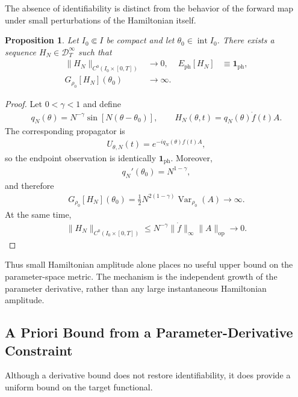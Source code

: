 \documentclass[twocolumn,prl,aps,floatfix]{revtex4-2}
\newtheorem{proposition}{Proposition}
\begin{document}
The absence of identifiability is distinct from the behavior of the forward map under small perturbations of the Hamiltonian itself.

\begin{proposition}
Let $I_0\Subset I$ be compact and let
$\theta_0\in\operatorname{int}I_0$. There exists a sequence
$H_N\in\mathcal D_T^\infty$ such that
\begin{align}
\|H_N\|_{C^0(I_0\times[0,T])}&\longrightarrow0,
&
E_{\mathrm{ph}}[H_N]&\equiv\mathbf 1_{\mathrm{ph}},
\label{eq:small_H}
\\
G_{\rho_0}[H_N](\theta_0)&\longrightarrow\infty .
\label{eq:large_G}
\end{align}
\end{proposition}

\begin{proof}
Let $0<\gamma<1$ and define
\begin{align}
q_N(\theta)
=
N^{-\gamma}
\sin\!\left[N(\theta-\theta_0)\right],
\qquad
H_N(\theta,t)
=
q_N(\theta)\dot f(t)A .
\end{align}
The corresponding propagator is
\begin{align}
U_{\theta,N}(t)
=
e^{-iq_N(\theta)f(t)A},
\end{align}
so the endpoint observation is identically $\mathbf 1_{\mathrm{ph}}$. Moreover,
\begin{align}
q_N'(\theta_0)=N^{1-\gamma},
\end{align}
and therefore
\begin{align}
G_{\rho_0}[H_N](\theta_0)
=
\frac{1}{2}
N^{2(1-\gamma)}
\operatorname{Var}_{\rho_0}(A)
\longrightarrow\infty .
\end{align}
At the same time,
\begin{align}
\|H_N\|_{C^0(I_0\times[0,T])}
\le
N^{-\gamma}\|\dot f\|_{\infty}
\|A\|_{\mathrm{op}}
\longrightarrow0.
\end{align}
\end{proof}

Thus small Hamiltonian amplitude alone places no useful upper bound on the parameter-space metric. The mechanism is the independent growth of the parameter derivative, rather than any large instantaneous Hamiltonian amplitude.

\subsection{A Priori Bound from a Parameter-Derivative Constraint}

Although a derivative bound does not restore identifiability, it does provide a uniform bound on the target functional.
\end{document}

